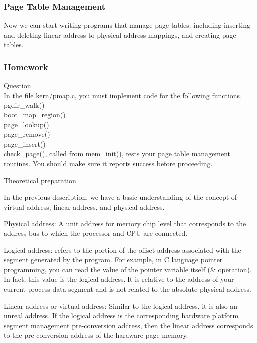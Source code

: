 \subsubsection{Page Table Management}
Now we can start writing programs that manage page tables: including inserting and deleting linear address-to-physical address mappings, and creating page tables.

\subsubsection{Homework }
\begin{flushleft}
{\Large Question}\\
In the file kern/pmap.c, you must implement code for the following functions.\\
pgdir\_walk()\\
boot\_map\_region()\\
page\_lookup()\\
page\_remove()\\
page\_insert()\\	
check\_page(), called from mem\_init(), tests your page table management routines. You should make sure it reports success before proceeding.\\
\end{flushleft}
\begin{flushleft}
{\Large Theoretical preparation}
\end{flushleft}

In the previous description, we have a basic understanding of the concept of virtual address, linear address, and physical address.

Physical address: A unit address for memory chip level that corresponds to the address bus to which the processor and CPU are connected.

Logical address: refers to the portion of the offset address associated with the segment generated by the program. For example, in C language pointer programming, you can read the value of the pointer variable itself (\& operation). In fact, this value is the logical address. It is relative to the address of your current process data segment and is not related to the absolute physical address.

Linear address or virtual address:
Similar to the logical address, it is also an unreal address. If the logical address is the corresponding hardware platform segment management pre-conversion address, then the linear address corresponds to the pre-conversion address of the hardware page memory.

